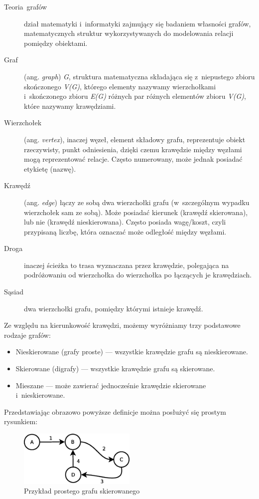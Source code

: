 \documentclass[a4paper,12pt,polish,oneside,openright]{thesis}
\begin{document}
\begin{description}
	\item[Teoria~grafów] dział matematyki i~informatyki zajmujący się badaniem własności grafów, matematycznych struktur wykorzystywanych do modelowania relacji pomiędzy obiektami.

	\item[Graf] (ang. \emph{graph}) \emph{G}, struktura matematyczna składająca się z~niepustego zbioru skończonego \emph{V(G)}, którego elementy nazywamy wierzchołkami i~skończonego zbioru \emph{E(G)} różnych par różnych elementów zbioru \emph{V(G)}, które nazywamy krawędziami.

	\item[Wierzchołek] (ang. \emph{vertex}), inaczej węzeł, element składowy grafu, reprezentuje obiekt rzeczywisty, punkt odniesienia, dzięki czemu krawędzie między węzłami mogą reprezentować relacje. Często numerowany, może jednak posiadać etykietę (nazwę).

	\item[Krawędź] (ang. \emph{edge}) łączy ze sobą dwa wierzchołki grafu (w~szczególnym wypadku wierzchołek sam ze sobą). Może posiadać kierunek (krawędź skierowana), lub nie (krawędź nieskierowana). Często posiada wagę/koszt, czyli przypisaną liczbę, która oznaczać może odległość między węzłami.

	\item[Droga] inaczej ścieżka to trasa wyznaczana przez krawędzie, polegająca na podróżowaniu od wierzchołka do wierzchołka po łączących je krawędziach.

	\item[Sąsiad] dwa wierzchołki grafu, pomiędzy którymi istnieje krawędź.
\end{description}

Ze względu na kierunkowość krawędzi, możemy wyróżniamy trzy podstawowe rodzaje grafów:
\begin{itemize}
	\item Nieskierowane (grafy proste) --- wszystkie krawędzie grafu są nieskierowane.
	\item Skierowane (digrafy) --- wszystkie krawędzie grafu są skierowane.
	\item Mieszane --- może zawierać jednocześnie krawędzie skierowane i~nieskierowane.
\end{itemize}

Przedstawiając obrazowo powyższe definicje można posłużyć się prostym rysunkiem:
\begin{figure}[htb]
	\begin{center}
		\includegraphics[width=0.5\textwidth]{gfx/small_graph.eps}
		\caption{Przykład prostego grafu skierowanego}
		\label{fig:smallgraph}
	\end{center}
\end{figure}
\end{document}
